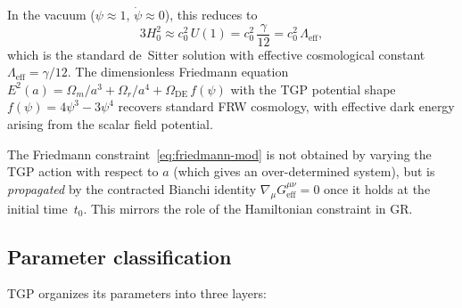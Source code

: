 In the vacuum ($\psi\approx 1$, $\dot\psi\approx 0$), this reduces to
\begin{equation}
  3H_{0}^{2} \approx c_{0}^{2}\,U(1)
  = c_{0}^{2}\,\frac{\gamma}{12}
  = c_{0}^{2}\,\Lambda_{\mathrm{eff}},
\end{equation}
which is the standard de~Sitter solution with effective cosmological
constant $\Lambda_{\mathrm{eff}}=\gamma/12$.  The dimensionless
Friedmann equation $E^{2}(a)=\Omega_{m}/a^{3}+\Omega_{r}/a^{4}
+\Omega_{\mathrm{DE}}\,f(\psi)$ with the TGP potential shape
$f(\psi)=4\psi^{3}-3\psi^{4}$ recovers standard FRW cosmology,
with effective dark energy arising from the scalar field potential.

\begin{remark}
The Friedmann constraint~\eqref{eq:friedmann-mod} is not obtained
by varying the TGP action with respect to $a$ (which gives an
over-determined system), but is \emph{propagated} by the contracted
Bianchi identity $\nabla_{\mu}G^{\mu\nu}_{\mathrm{eff}}=0$ once
it holds at the initial time~$t_{0}$.
This mirrors the role of the Hamiltonian constraint in GR.
\end{remark}

\subsection{Parameter classification}\label{ssec:params}

TGP organizes its parameters into three layers:

